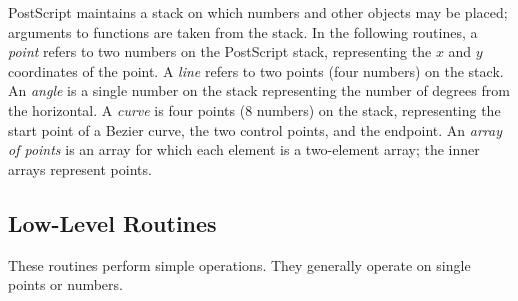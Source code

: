 \documentclass[12pt]{article}
\begin{document}
PostScript maintains a stack on which numbers and other objects may be placed;
arguments to functions are taken from the stack. In the following routines, a
\emph{point} refers to two numbers on the PostScript stack, representing the $x$
and $y$ coordinates of the point. A \emph{line} refers to two points (four
numbers) on the stack. An \emph{angle} is a single number on the stack
representing the number of degrees from the horizontal. A \emph{curve} is four
points (8 numbers) on the stack, representing the start point of a Bezier curve,
the two control points, and the endpoint. An \emph{array of points} is an array
for which each element is a two-element array; the inner arrays represent
points.

\subsection{Low-Level Routines}

These routines perform simple operations. They generally operate on single
points or numbers.
\end{document}
